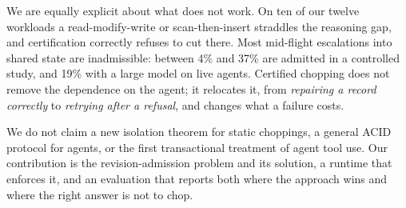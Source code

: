 We are equally explicit about what does not work. On ten of our twelve
workloads a read-modify-write or scan-then-insert straddles the reasoning gap,
and certification correctly refuses to cut there. Most mid-flight escalations
into shared state are inadmissible: between 4\% and 37\% are admitted in a
controlled study, and 19\% with a large model on live agents. Certified
chopping does not remove the dependence on the agent; it relocates it, from
\emph{repairing a record correctly} to \emph{retrying after a refusal}, and
changes what a failure costs.

We do not claim a new isolation theorem for static choppings, a general ACID
protocol for agents, or the first transactional treatment of agent tool use.
Our contribution is the revision-admission problem and its solution, a runtime
that enforces it, and an evaluation that reports both where the approach wins
and where the right answer is not to chop.
